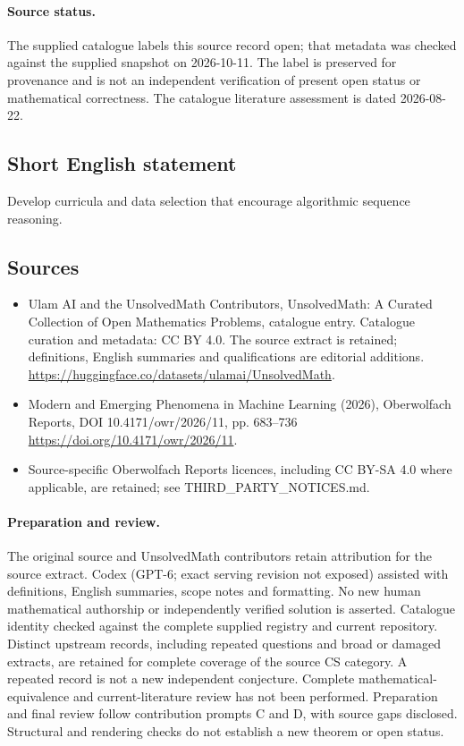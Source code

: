 \documentclass[11pt]{article}
\begin{document}
\paragraph{Source status.}
The supplied catalogue labels this source record open; that metadata was checked against the supplied snapshot on 2026-10-11. The label is preserved for provenance and is not an independent verification of present open status or mathematical correctness. The catalogue literature assessment is dated 2026-08-22.
\subsection{Short English statement}
Develop curricula and data selection that encourage algorithmic sequence reasoning.
\subsection{Sources}
\begin{itemize}
\item[S1] Ulam AI and the UnsolvedMath Contributors, UnsolvedMath: A Curated Collection of Open Mathematics Problems, catalogue entry. Catalogue curation and metadata: CC BY 4.0. The source extract is retained; definitions, English summaries and qualifications are editorial additions.
\url{https://huggingface.co/datasets/ulamai/UnsolvedMath}.
\item[S2] Modern and Emerging Phenomena in Machine Learning (2026), Oberwolfach Reports, DOI 10.4171/owr/2026/11, pp. 683--736
\url{https://doi.org/10.4171/owr/2026/11}.
\item Source-specific Oberwolfach Reports licences, including CC BY-SA 4.0 where applicable, are retained; see THIRD\_PARTY\_NOTICES.md.
\end{itemize}
\paragraph{Preparation and review.}
The original source and UnsolvedMath contributors retain attribution for the source extract. Codex (GPT-6; exact serving revision not exposed) assisted with definitions, English summaries, scope notes and formatting. No new human mathematical authorship or independently verified solution is asserted. Catalogue identity checked against the complete supplied registry and current repository. Distinct upstream records, including repeated questions and broad or damaged extracts, are retained for complete coverage of the source CS category. A repeated record is not a new independent conjecture. Complete mathematical-equivalence and current-literature review has not been performed. Preparation and final review follow contribution prompts C and D, with source gaps disclosed. Structural and rendering checks do not establish a new theorem or open status.
\label{end:statement}
\end{document}
